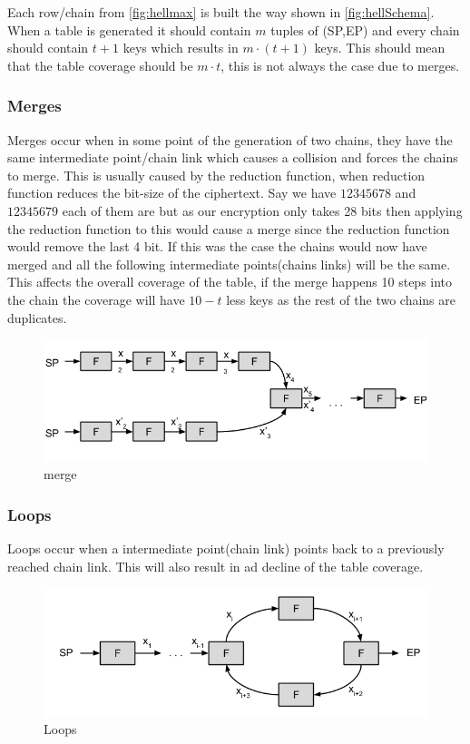 Each row/chain from \ref{fig:hellmax} is built the way shown in \ref{fig:hellSchema}. When a table is generated it should contain $m$ tuples of (SP,EP) and every chain should contain $t+1$ keys which results in $m\cdot(t+1)$ keys. This should mean that the table coverage should be $m \cdot t$, this is not always the case due to merges.

\subsubsection{Merges}
Merges occur when in some point of the generation of two chains, they have the same intermediate point/chain link which causes a collision and forces the chains to merge. This is usually caused by the reduction function, when reduction function reduces the bit-size of the ciphertext.
Say we have  $12345678$ and  $12345679$ each of them are  but as our encryption only takes 28 bits then applying the reduction function to this would cause a merge since the reduction function would remove the last 4 bit. If this was the case the chains would now have merged and all the following intermediate points(chains links) will be the same. This affects the overall coverage of the table, if the merge happens 10 steps into the chain the coverage will have $10 - t$ less keys as the rest of the two chains are duplicates.
\\
\begin{figure}[th]
  \centering
  \includegraphics[width=\textwidth]{figures/Merge.png}
  \caption{merge}
  \label{fig:merge}
\end{figure}
\subsubsection{Loops}
Loops occur when a intermediate point(chain link) points back to a previously reached chain link. This will also result in ad decline of the table coverage.

\begin{figure}[th]
  \centering
  \includegraphics[width=\textwidth]{figures/Loop.png}
  \caption{Loops}
  \label{fig:loops}
\end{figure}


